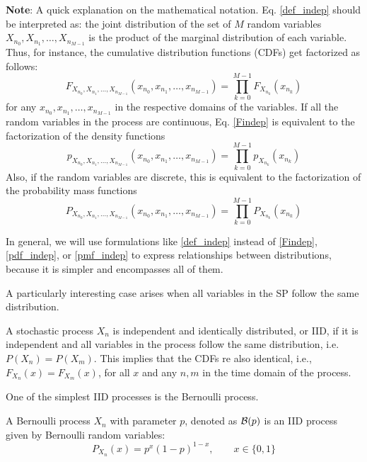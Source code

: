 \textbf{Note}: A quick explanation on the mathematical notation. Eq. \eqref{def_indep} should be interpreted as: the joint distribution of the set of $M$ random variables $X_{n_0}, X_{n_1}, \ldots, X_{n_{M-1}}$ is the product of the marginal distribution of each variable. Thus, for instance, the cumulative distribution functions (CDFs) get factorized as follows:
\begin{equation}
\label{Findep}
F_{X_{n_0}, X_{n_1}, \ldots, X_{n_{M-1}}}(x_{n_0}, x_{n_1}, \ldots, x_{n_{M-1}}) 
	= \prod_{k=0}^{M-1} F_{X_{n_k}}(x_{n_k})
\end{equation}
for any $x_{n_0}, x_{n_1}, \ldots, x_{n_{M-1}}$ in the respective domains of the variables. If all the random variables in the process are continuous, Eq. \eqref{Findep} is equivalent to the factorization of the density functions
\begin{equation}
\label{pdf_indep}
p_{X_{n_0}, X_{n_1}, \ldots, X_{n_{M-1}}}(x_{n_0}, x_{n_1}, \ldots, x_{n_{M-1}}) 
	= \prod_{k=0}^{M-1} p_{X_{n_k}}(x_{n_k})
\end{equation}
Also, if the random variables are discrete, this is equivalent to the factorization of the probability mass functions
\begin{equation}
\label{pmf_indep}
P_{X_{n_0}, X_{n_1}, \ldots, X_{n_{M-1}}}(x_{n_0}, x_{n_1}, \ldots, x_{n_{M-1}}) 
	= \prod_{k=0}^{M-1} P_{X_{n_k}}(x_{n_k})
\end{equation}

In general, we will use formulations like \eqref{def_indep} instead of \eqref{Findep}, \eqref{pdf_indep}, or \eqref{pmf_indep} to express relationships between distributions, because it is simpler and encompasses all of them.

A particularly interesting case arises when all variables in the SP follow the same distribution.

\begin{definition}

A stochastic process $X_n$ is independent and identically distributed, or IID, if it is independent and all variables in the process follow the same distribution, i.e. $P(X_n)=P(X_m)$. This implies that the CDFs re also identical, i.e., $F_{X_n}(x)= F_{X_m}(x)$, for all $x$ and any $n, m$ in the time domain of the process.
\end{definition}

One of the simplest IID processes is the Bernoulli process.

\begin{example}
A Bernoulli process $X_n$ with parameter $p$, denoted as ${\cal B}(p)$ is an IID process given by Bernoulli random variables:
\begin{equation}
\label{SP:Bernoulli}
P_{X_n}(x) = p^x (1-p)^{1-x},  \qquad x \in \{0, 1\}
\end{equation}
\end{example}

